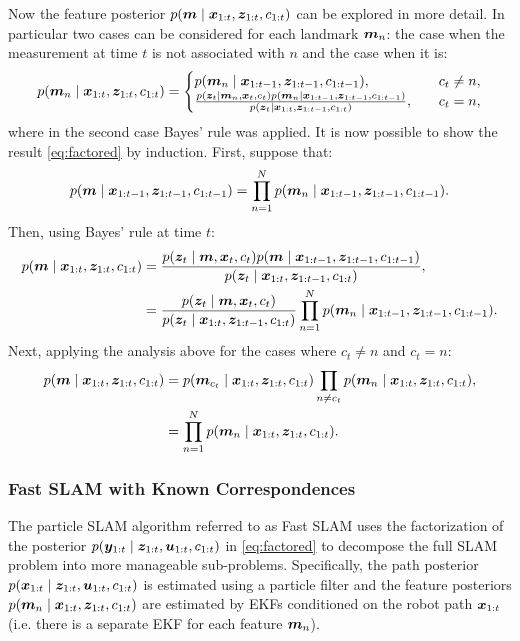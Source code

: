 Now the feature posterior $p(\bm{m} \mid \bm{x}_{1:t}, \bm{z}_{1:t},  c_{1:t})$ can be explored in more detail. In particular two cases can be considered for each landmark $\bm{m}_n$: the case when the measurement at time $t$ is not associated with $n$ and the case when it is:
\begin{equation*}
p(\bm{m}_n \mid \bm{x}_{1:t}, \bm{z}_{1:t}, c_{1:t}) = \begin{cases}
p(\bm{m}_n \mid \bm{x}_{1:t-1}, \bm{z}_{1:t-1},  c_{1:t-1}), \quad &c_t \neq n, \\
\frac{p(\bm{z}_t \mid \bm{m}_n, \bm{x}_{t}, c_{t})p(\bm{m}_n \mid \bm{x}_{1:t-1}, \bm{z}_{1:t-1}, c_{1:t-1})}{p(\bm{z}_t \mid \bm{x}_{1:t}, \bm{z}_{1:t-1}, c_{1:t})}, \quad &c_t = n,
\end{cases}
\end{equation*}
where in the second case Bayes' rule was applied. It is now possible to show the result \eqref{eq:factored} by induction. First, suppose that:
\begin{equation*}
p(\bm{m} \mid \bm{x}_{1:t-1}, \bm{z}_{1:t-1},  c_{1:t-1}) = \prod_{n=1}^N p(\bm{m}_n \mid \bm{x}_{1:t-1}, \bm{z}_{1:t-1},  c_{1:t-1}).
\end{equation*}
Then, using Bayes' rule at time $t$:
\begin{equation*}
\begin{split}
p(\bm{m} \mid \bm{x}_{1:t}, \bm{z}_{1:t}, c_{1:t}) &= \frac{p(\bm{z}_t \mid \bm{m}, \bm{x}_{t}, c_{t})p(\bm{m} \mid \bm{x}_{1:t-1}, \bm{z}_{1:t-1}, c_{1:t-1})}{p(\bm{z}_t \mid \bm{x}_{1:t}, \bm{z}_{1:t-1}, c_{1:t})}, \\
&= \frac{p(\bm{z}_t \mid \bm{m}, \bm{x}_{t}, c_{t})}{p(\bm{z}_t \mid \bm{x}_{1:t}, \bm{z}_{1:t-1}, c_{1:t})} \prod_{n=1}^N p(\bm{m}_n \mid \bm{x}_{1:t-1}, \bm{z}_{1:t-1},  c_{1:t-1}). \\
\end{split}
\end{equation*}
Next, applying the analysis above for the cases where $c_t \neq n$ and $c_t = n$:
\begin{equation*}
\begin{split}
p(\bm{m} \mid \bm{x}_{1:t}, \bm{z}_{1:t}, c_{1:t}) &= p(\bm{m}_{c_t} \mid \bm{x}_{1:t}, \bm{z}_{1:t},  c_{1:t}) \prod_{n\neq c_t} p(\bm{m}_n \mid \bm{x}_{1:t}, \bm{z}_{1:t},  c_{1:t}), \\
&= \prod_{n=1}^N p(\bm{m}_n \mid \bm{x}_{1:t}, \bm{z}_{1:t},  c_{1:t}). \\
\end{split}
\end{equation*}

\subsubsection{Fast SLAM with Known Correspondences}
The particle SLAM algorithm referred to as Fast SLAM uses the factorization of the posterior $p(\bm{y}_{1:t} \mid \bm{z}_{1:t}, \bm{u}_{1:t}, c_{1:t})$ in \eqref{eq:factored} to decompose the full SLAM problem into more manageable sub-problems. Specifically, the path posterior $p(\bm{x}_{1:t} \mid \bm{z}_{1:t}, \bm{u}_{1:t}, c_{1:t})$ is estimated using a particle filter and the feature posteriors $p(\bm{m}_n \mid \bm{x}_{1:t}, \bm{z}_{1:t},  c_{1:t})$ are estimated by EKFs conditioned on the robot path $\bm{x}_{1:t}$ (i.e. there is a separate EKF for each feature $\bm{m}_n$).

